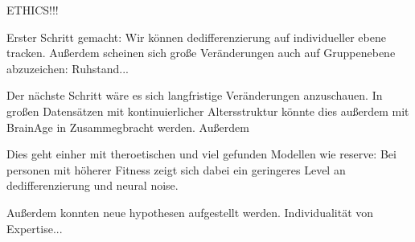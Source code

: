 ETHICS!!!

Erster Schritt gemacht: Wir können dedifferenzierung auf individueller ebene tracken. Außerdem scheinen sich große Veränderungen auch auf Gruppenebene abzuzeichen: Ruhstand... 

Der nächste Schritt wäre es sich langfristige Veränderungen anzuschauen. In großen Datensätzen mit kontinuierlicher Altersstruktur könnte dies außerdem mit BrainAge in Zusammegbracht werden. Außerdem 


Dies geht einher mit theroetischen und viel gefunden Modellen wie reserve: Bei personen mit höherer Fitness zeigt sich dabei ein geringeres Level an dedifferenzierung und neural noise. 

Außerdem konnten neue hypothesen aufgestellt werden. Individualität von Expertise...


